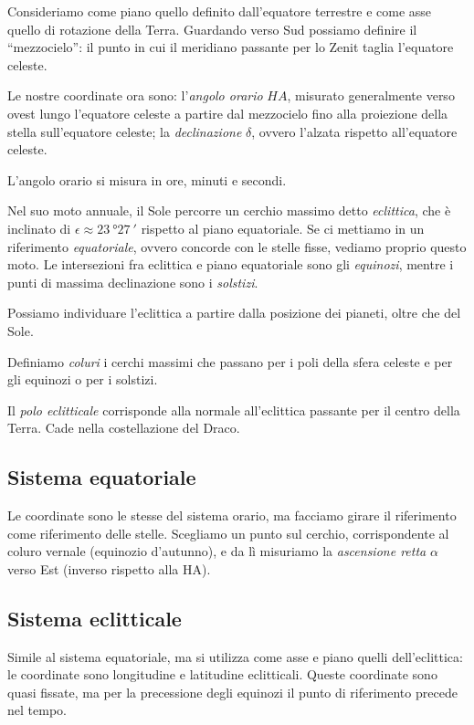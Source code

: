 \documentclass[main.tex]{subfiles}
\begin{document}
Consideriamo come piano quello definito dall'equatore terrestre e come asse quello di rotazione della Terra. 
Guardando verso Sud possiamo definire il ``mezzocielo'': il punto in cui il meridiano passante per lo Zenit taglia l'equatore celeste. 

Le nostre coordinate ora sono: l'\emph{angolo orario} \(HA\), misurato generalmente verso ovest lungo l'equatore celeste a partire dal mezzocielo fino alla proiezione della stella sull'equatore celeste; la \emph{declinazione} \(\delta \), ovvero l'alzata rispetto all'equatore celeste. 

L'angolo orario si misura in ore, minuti e secondi.

Nel suo moto annuale, il Sole percorre un cerchio massimo detto \emph{eclittica}, che è inclinato di \(\epsilon \approx \SI{23}{\degree} \SI{27}{\prime}\) rispetto al piano equatoriale. 
Se ci mettiamo in un riferimento \emph{equatoriale}, ovvero concorde con le stelle fisse, vediamo proprio questo moto. 
Le intersezioni fra eclittica e piano equatoriale sono gli \emph{equinozi}, mentre i punti di massima declinazione sono i \emph{solstizi}.

Possiamo individuare l'eclittica a partire dalla posizione dei pianeti, oltre che del Sole. 

Definiamo \emph{coluri} i cerchi massimi che passano per i poli della sfera celeste e per gli equinozi o per i solstizi.

Il \emph{polo eclitticale} corrisponde alla normale all'eclittica passante per il centro della Terra. Cade nella costellazione del Draco. 

\subsection{Sistema equatoriale}

Le coordinate sono le stesse del sistema orario, ma facciamo girare il riferimento come riferimento delle stelle. 
Scegliamo un punto sul cerchio, corrispondente al coluro vernale (equinozio d'autunno), e da lì misuriamo la \emph{ascensione retta} \(\alpha \) verso Est (inverso rispetto alla HA).

\subsection{Sistema eclitticale}

Simile al sistema equatoriale, ma si utilizza come asse e piano quelli dell'eclittica: le coordinate sono longitudine e latitudine eclitticali. 
Queste coordinate sono quasi fissate, ma per la precessione degli equinozi il punto di riferimento precede nel tempo.
\end{document}
